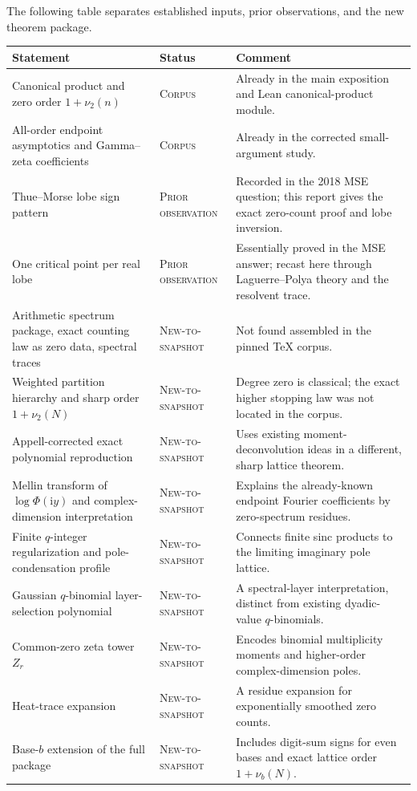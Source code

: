\documentclass[11pt,oneside]{article}
\numberwithin{equation}{section}
\theoremstyle{definition}
\theoremstyle{remark}
\newcommand{\ii}{\mathrm i}
\newcommand{\Corpus}{\textsc{Corpus}}
\newcommand{\NewResult}{\textsc{New-to-snapshot}}
\newcommand{\Observed}{\textsc{Prior observation}}
\begin{document}
The following table separates established inputs, prior observations, and the
new theorem package.
\begin{longtable}{@{}p{}p{}p{}@{}}
\toprule
Statement & Status & Comment \\
\midrule
\endhead
Canonical product and zero order $1+\nu_2(n)$ & \Corpus & Already in the main
exposition and Lean canonical-product module. \\
All-order endpoint asymptotics and Gamma--zeta coefficients & \Corpus & Already
in the corrected small-argument study. \\
Thue--Morse lobe sign pattern & \Observed & Recorded in the 2018 MSE question;
this report gives the exact zero-count proof and lobe inversion. \\
One critical point per real lobe & \Observed & Essentially proved in the MSE
answer; recast here through Laguerre--Polya theory and the resolvent trace. \\
Arithmetic spectrum package, exact counting law as zero data, spectral traces &
\NewResult & Not found assembled in the pinned TeX corpus. \\
Weighted partition hierarchy and sharp order $1+\nu_2(N)$ & \NewResult & Degree
zero is classical; the exact higher stopping law was not located in the corpus. \\
Appell-corrected exact polynomial reproduction & \NewResult & Uses existing
moment-deconvolution ideas in a different, sharp lattice theorem. \\
Mellin transform of $\log\Phi(\ii y)$ and complex-dimension interpretation &
\NewResult & Explains the already-known endpoint Fourier coefficients by zero-spectrum residues. \\
Finite $q$-integer regularization and pole-condensation profile & \NewResult &
Connects finite sinc products to the limiting imaginary pole lattice. \\
Gaussian $q$-binomial layer-selection polynomial & \NewResult & A spectral-layer
interpretation, distinct from existing dyadic-value $q$-binomials. \\
Common-zero zeta tower $Z_r$ & \NewResult & Encodes binomial multiplicity moments
and higher-order complex-dimension poles. \\
Heat-trace expansion & \NewResult & A residue expansion for exponentially smoothed
zero counts. \\
Base-$b$ extension of the full package & \NewResult & Includes digit-sum signs for
even bases and exact lattice order $1+\nu_b(N)$. \\
\bottomrule
\end{longtable}
\end{document}
